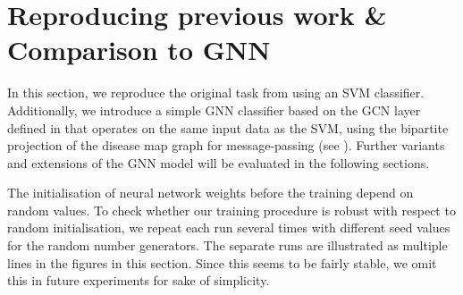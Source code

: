 \documentclass[
	fontsize=10pt, %
	twoside=false, %
	secnumdepth=1, %
  toc=indentunnumbered %
]{kaobook}
\begin{document}



\section{Reproducing previous work \& Comparison to GNN}
\label{sec:reproducing}

In this section, we reproduce the original task from \nielsen{} using an SVM
classifier. Additionally, we introduce a simple GNN classifier based on the
GCN layer defined in  that operates on
the same input data as the SVM, using the bipartite projection of the disease
map graph for message-passing (see ). Further
variants and extensions of the GNN model will be evaluated in the following
sections.

The initialisation of neural network weights before the training depend on
random values. To check whether our training procedure is robust with respect to random
initialisation, we repeat each run several times with different seed values for
the random number generators. The separate runs are illustrated as multiple
lines in the figures in this section. Since this seems to be fairly stable, we omit this
in future experiments for sake of simplicity.
\end{document}
